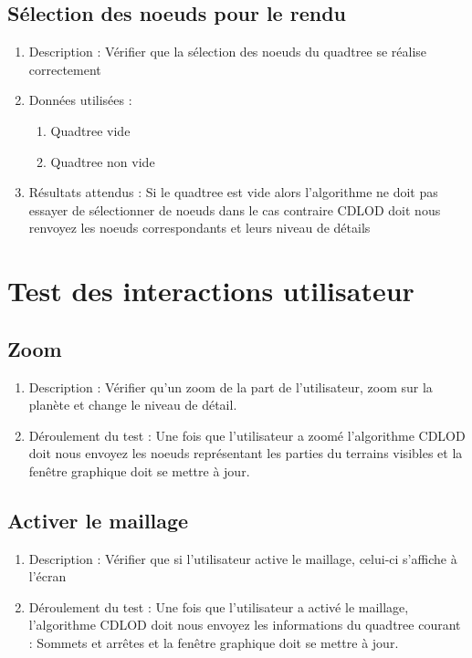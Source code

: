 \documentclass[12pt]{report}
\begin{document}
\subsection{Sélection des noeuds pour le rendu}
\begin{enumerate}
    \item Description : Vérifier que la sélection des noeuds du quadtree se réalise correctement 
    \item Données utilisées :
    \begin{enumerate}
        \item Quadtree vide
        \item Quadtree non vide
    \end{enumerate}
    \item Résultats attendus : Si le quadtree est vide alors l'algorithme ne doit pas essayer de sélectionner de noeuds dans le cas contraire CDLOD doit nous renvoyez les noeuds correspondants et leurs niveau de détails
\end{enumerate}

\section{Test des interactions utilisateur}
\subsection{Zoom}
\begin{enumerate}
    \item Description : Vérifier qu'un zoom de la part de l'utilisateur, zoom sur la planète et change le niveau de détail.
    \item Déroulement du test : Une fois que l'utilisateur a zoomé l'algorithme CDLOD doit nous envoyez les noeuds représentant les parties du terrains visibles et la fenêtre graphique doit se mettre à jour.
\end{enumerate}

\subsection{Activer le maillage}
\begin{enumerate}
    \item Description : Vérifier que si l'utilisateur active le maillage, celui-ci s'affiche à l'écran
    \item Déroulement du test : Une fois que l'utilisateur a activé le maillage, l'algorithme CDLOD doit nous envoyez les informations du quadtree courant : Sommets et arrêtes et la fenêtre graphique doit se mettre à jour.
\end{enumerate}
\end{document}
